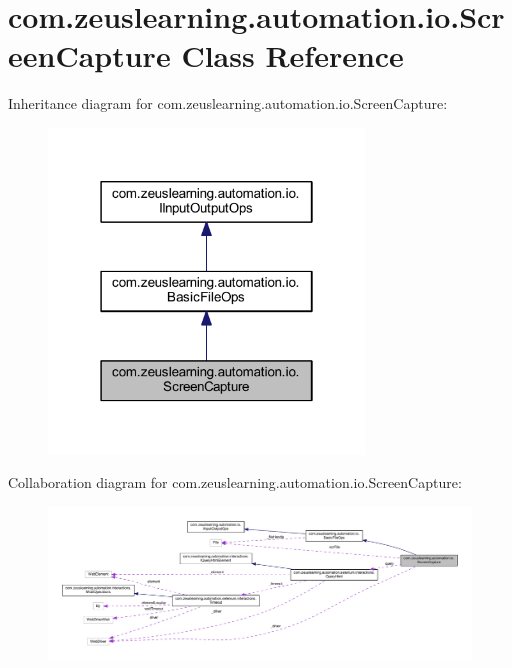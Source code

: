 \hypertarget{classcom_1_1zeuslearning_1_1automation_1_1io_1_1ScreenCapture}{}\section{com.\+zeuslearning.\+automation.\+io.\+Screen\+Capture Class Reference}
\label{classcom_1_1zeuslearning_1_1automation_1_1io_1_1ScreenCapture}


Inheritance diagram for com.\+zeuslearning.\+automation.\+io.\+Screen\+Capture\+:\nopagebreak
\begin{figure}[H]
\begin{center}
\leavevmode
\includegraphics[width=238pt]{d7/dc6/classcom_1_1zeuslearning_1_1automation_1_1io_1_1ScreenCapture__inherit__graph}
\end{center}
\end{figure}


Collaboration diagram for com.\+zeuslearning.\+automation.\+io.\+Screen\+Capture\+:
\nopagebreak
\begin{figure}[H]
\begin{center}
\leavevmode
\includegraphics[width=350pt]{d2/dae/classcom_1_1zeuslearning_1_1automation_1_1io_1_1ScreenCapture__coll__graph}
\end{center}
\end{figure}
